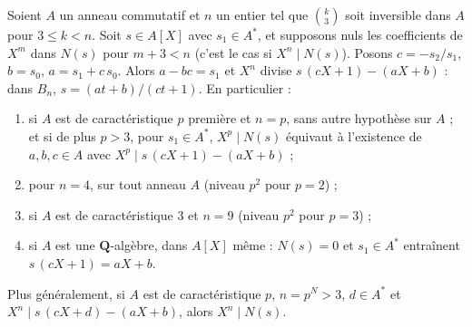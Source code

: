 \begin{enonce}
Soient $A$ un anneau commutatif et $n$ un entier tel que $\binom k3$ soit inversible dans $A$ pour $3 \leq k < n$. Soit $s \in A[X]$ avec $s_1 \in A^*$, et supposons nuls les coefficients de $X^m$ dans $N(s)$ pour $m + 3 < n$ (c'est le cas si $X^n \mid N(s)$). Posons $c = -s_2/s_1$, $b = s_0$, $a = s_1 + c\,s_0$. Alors $a - bc = s_1$ et $X^n$ divise $s\,(cX + 1) - (aX + b)$ : dans $B_n$, $s = (at + b)/(ct + 1)$. En particulier :
\begin{enumerate}
\item si $A$ est de caractéristique $p$ première et $n = p$, sans autre hypothèse sur $A$ ; et si de plus $p > 3$, pour $s_1 \in A^*$, $X^p \mid N(s)$ équivaut à l'existence de $a, b, c \in A$ avec $X^p \mid s\,(cX + 1) - (aX + b)$ ;
\item pour $n = 4$, sur tout anneau $A$ (niveau $p^2$ pour $p = 2$) ;
\item si $A$ est de caractéristique $3$ et $n = 9$ (niveau $p^2$ pour $p = 3$) ;
\item si $A$ est une $\mathbf Q$-algèbre, dans $A[X]$ même : $N(s) = 0$ et $s_1 \in A^*$ entraînent $s\,(cX + 1) = aX + b$.
\end{enumerate}
Plus généralement, si $A$ est de caractéristique $p$, $n = p^N > 3$, $d \in A^*$ et $X^n \mid s\,(cX + d) - (aX + b)$, alors $X^n \mid N(s)$.
\end{enonce}

